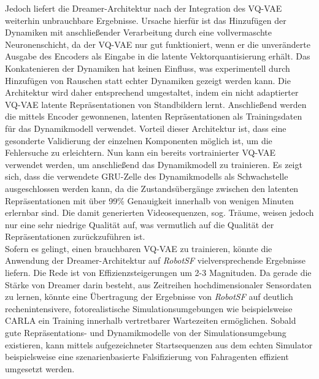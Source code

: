 Jedoch liefert die Dreamer-Architektur nach der Integration des VQ-VAE weiterhin unbrauchbare
Ergebnisse. Ursache hierfür ist das Hinzufügen
der Dynamiken mit anschließender Verarbeitung durch eine vollvermaschte Neuronenschicht,
da der VQ-VAE nur gut funktioniert, wenn er die unveränderte Ausgabe des Encoders als
Eingabe in die latente Vektorquantisierung erhält. Das Konkatenieren der Dynamiken hat keinen
Einfluss, was experimentell durch Hinzufügen von Rauschen statt echter Dynamiken gezeigt
werden kann. Die Architektur wird daher entsprechend umgestaltet, indem ein nicht
adaptierter VQ-VAE latente Repräsentationen von Standbildern lernt. Anschließend werden
die mittels Encoder gewonnenen, latenten Repräsentationen als Trainingsdaten für das
Dynamikmodell verwendet. Vorteil dieser Architektur ist, dass eine gesonderte Validierung
der einzelnen Komponenten möglich ist, um die Fehlersuche zu erleichtern. Nun kann ein
bereits vortrainierter VQ-VAE verwendet werden, um anschließend das Dynamikmodell
zu trainieren. Es zeigt sich, dass die verwendete GRU-Zelle des Dynamikmodells als
Schwachstelle ausgeschlossen werden kann, da die Zustandsübergänge zwischen den latenten
Repräsentationen mit über 99\% Genauigkeit innerhalb von wenigen Minuten erlernbar sind.
Die damit generierten Videosequenzen, sog. Träume, weisen jedoch nur eine sehr niedrige
Qualität auf, was vermutlich auf die Qualität der Repräsentationen zurückzuführen ist.\\

Sofern es gelingt, einen brauchbaren VQ-VAE zu trainieren, könnte die Anwendung der
Dreamer-Architektur auf \emph{RobotSF} vielversprechende Ergebnisse liefern. Die Rede
ist von Effizienzsteigerungen um 2-3 Magnituden. Da gerade die Stärke von Dreamer darin
besteht, aus Zeitreihen hochdimensionaler Sensordaten zu lernen, könnte eine Übertragung
der Ergebnisse von \emph{RobotSF} auf deutlich rechenintensivere, fotorealistische
Simulationsumgebungen wie beispielsweise CARLA ein Training innerhalb vertretbarer
Wartezeiten ermöglichen. Sobald gute Repräsentations- und Dynamikmodelle von der
Simulationsumgebung existieren, kann mittels aufgezeichneter Startsequenzen aus dem echten
Simulator beispielsweise eine szenarienbasierte Falsifizierung von Fahragenten effizient
umgesetzt werden.
